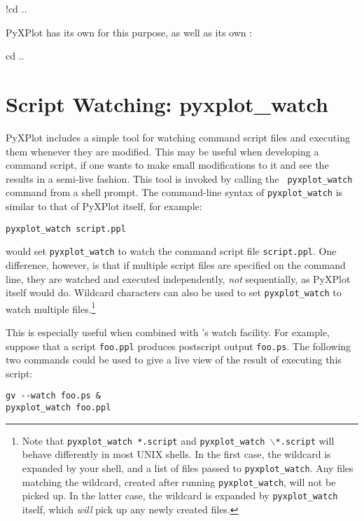 \begin{dontdo}
!cd ..
\end{dontdo}

PyXPlot has its own  for this purpose, as well as its own
:

\begin{dodo}
cd ..
\end{dodo}

\section{Script Watching: pyxplot\_watch}

PyXPlot includes a simple tool for watching command script files and executing
them whenever they are modified. This may be useful when developing a command
script, if one wants to make small modifications to it and see the results in a
semi-live fashion. This tool is invoked by calling the {\tt
pyxplot\_watch} command from a
shell prompt. The command-line syntax of {\tt pyxplot\_watch} is similar to
that of PyXPlot itself, for example:

\begin{verbatim}
pyxplot_watch script.ppl
\end{verbatim}

\noindent would set {\tt pyxplot\_watch} to watch the command script file
{\tt script.ppl}. One difference, however, is that if multiple script files are
specified on the command line, they are watched and executed independently,
\textit{not} sequentially, as PyXPlot itself would do. Wildcard characters can
also be used to set {\tt pyxplot\_watch} to watch multiple
files.\footnote{Note that {\tt pyxplot\_watch *.script} and
{\tt pyxplot\_watch $\backslash$*.script} will behave differently in most
UNIX shells.  In the first case, the wildcard is expanded by your shell, and a
list of files passed to {\tt pyxplot\_watch}. Any files matching the
wildcard, created after running {\tt pyxplot\_watch}, will not be picked up.
In the latter case, the wildcard is expanded by {\tt pyxplot\_watch} itself,
which {\it will} pick up any newly created files.}

This is especially useful when combined with \ghostview's
watch facility. For example, suppose that a script {\tt foo.ppl} produces
postscript output {\tt foo.ps}. The following two commands could be used to
give a live view of the result of executing this script:

\begin{verbatim}
gv --watch foo.ps &
pyxplot_watch foo.ppl
\end{verbatim}


